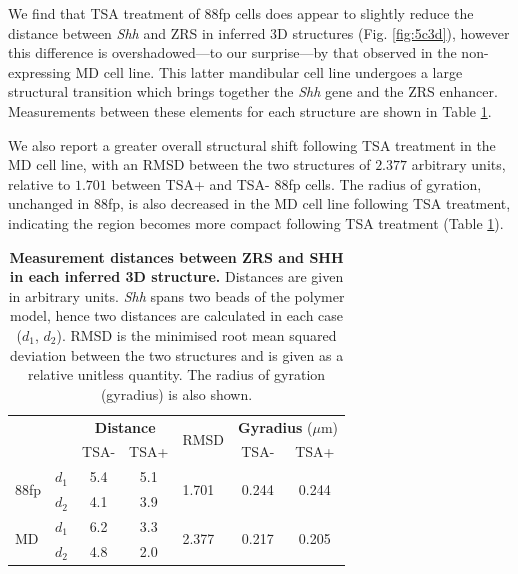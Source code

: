 \documentclass[a4paper,11pt,oneside]{book}
\begin{document}
We find that TSA treatment of 88fp cells does appear to slightly reduce the distance between \emph{Shh} and ZRS in inferred 3D structures (Fig. \ref{fig:5c3d}), however this difference is overshadowed---to our surprise---by that observed in the non-expressing MD cell line. This latter mandibular cell line undergoes a large structural transition which brings together the \emph{Shh} gene and the ZRS enhancer. Measurements between these elements for each structure are shown in Table \ref{tab:3ddist}.

We also report a greater overall structural shift following TSA treatment in the MD cell line, with an RMSD between the two structures of $2.377$ arbitrary units, relative to $1.701$ between TSA+ and TSA- 88fp cells. The radius of gyration, unchanged in 88fp, is also decreased in the MD cell line following TSA treatment, indicating the region becomes more compact following TSA treatment (Table \ref{tab:3ddist}).

\begin{table}[]
\centering
\caption[Measurement distances between ZRS and SHH in each inferred 3D structure.]{ {\bf Measurement distances between ZRS and SHH in each inferred 3D structure. }
Distances are given in arbitrary units. \emph{Shh} spans two beads of the polymer model, hence two distances are calculated in each case ($d_1$, $d_2$). RMSD is the minimised root mean squared deviation between the two structures and is given as a relative unitless quantity. The radius of gyration (gyradius) is also shown.
}
\label{tab:3ddist}
\begin{tabular}{ll|cc|l|cc|}
                      &    & \multicolumn{2}{c|}{{\bf Distance}} & \multirow{2}{*}{RMSD}   & \multicolumn{2}{c|}{{\bf Gyradius } ($\mu$m)}             \\
                      &    & TSA-             & TSA+             &                        & TSA-                   & TSA+                   \\ \hline
\multirow{2}{*}{88fp} & $d_1$ & 5.4              & 5.1              & \multirow{2}{*}{1.701} & \multirow{2}{*}{0.244} & \multirow{2}{*}{0.244} \\
                      & $d_2$ & 4.1              & 3.9              &                        &                        &                        \\ \hline
\multirow{2}{*}{MD}   & $d_1$ & 6.2              & 3.3              & \multirow{2}{*}{2.377} & \multirow{2}{*}{0.217} & \multirow{2}{*}{0.205} \\
                      & $d_2$ & 4.8              & 2.0              &                        &                        &                        \\ \hline
\end{tabular}
\end{table}
\end{document}
